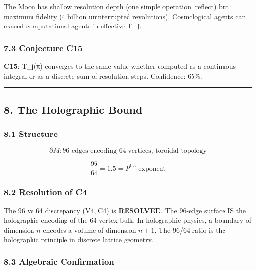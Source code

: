 \documentclass[
  11pt,
]{article}
\begin{document}
The Moon has shallow resolution depth (one simple operation: reflect)
but maximum fidelity (4 billion uninterrupted revolutions). Cosmological
agents can exceed computational agents in effective T\_∫.

\subsubsection{7.3 Conjecture C15}\label{conjecture-c15}

\textbf{C15}: T\_∫(π) converges to the same value whether computed as a
continuous integral or as a discrete sum of resolution steps.
Confidence: 65\%.

\begin{center}\rule{0.5\linewidth}{0.5pt}\end{center}

\subsection{8. The Holographic Bound}\label{the-holographic-bound}

\subsubsection{8.1 Structure}\label{structure}

\[\partial M: \text{96 edges encoding 64 vertices, toroidal topology}\]

\[\frac{96}{64} = 1.5 = P^{1.5} \text{ exponent}\]

\subsubsection{8.2 Resolution of C4}\label{resolution-of-c4}

The 96 vs 64 discrepancy (V4, C4) is \textbf{RESOLVED}. The 96-edge
surface IS the holographic encoding of the 64-vertex bulk. In
holographic physics, a boundary of dimension \(n\) encodes a volume of
dimension \(n+1\). The 96/64 ratio is the holographic principle in
discrete lattice geometry.

\subsubsection{8.3 Algebraic Confirmation}\label{algebraic-confirmation}
\end{document}
